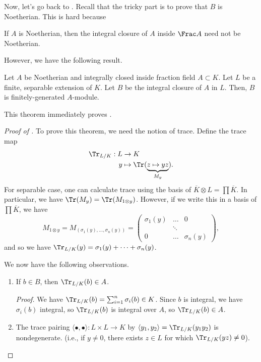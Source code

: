 Now, let's go back to .
Recall that the tricky part is to prove that $B$ is Noetherian.
This is hard because
\begin{remark}
    If $A$ is Noetherian, then the integral closure
    of $A$ inside $\Frac A$ need not be Noetherian.
\end{remark}
However, we have the following result.
\begin{theorem}
    \label{thm:aklb_finite_module}
    Let $A$ be Noetherian and integrally closed
    inside fraction field $A\subset K$.
    Let $L$ be a finite, separable extension of $K$.
    Let $B$ be the integral closure of $A$ in $L$.
    Then, $B$ is finitely-generated $A$-module.
\end{theorem}
This theorem immediately proves .
\begin{proof}[Proof of ]
    To prove this theorem, we need the notion of trace.
    Define the trace map
    \begin{align*}
	\Tr_{L/K} : L &\to K \\
	y &\mapsto \Tr(\underbrace{z\mapsto yz}_{M_y}).
    \end{align*}
    For separable case, one can calculate trace
    using the basis of $\overline K\otimes L = \prod\overline K$.
    In particular, we have $\Tr(M_y) = \Tr(M_{1\otimes y})$.
    However, if we write this in a basis of $\prod \overline K$,
    we have
    $$M_{1\otimes y} = M_{(\sigma_1(y),\dots,\sigma_n(y))}
    = \begin{pmatrix}
	\sigma_1(y) & \dots & 0 \\
	& \ddots & \\
	0 & \dots & \sigma_n(y)
    \end{pmatrix},$$
    and so we have $\Tr_{L/K}(y) = \sigma_1(y) + \dots + \sigma_n(y)$.

    We now have the following observations.
    \begin{enumerate}
    \item If $b\in B$, then $\Tr_{L/K}(b)\in A$.

    \emph{Proof.} We have $\Tr_{L/K}(b) = \sum_{i=1}^n \sigma_i(b)\in K$.
    Since $b$ is integral, we have $\sigma_i(b)$ integral,
    so $\Tr_{L/K}(b)$ is integral over $A$,
    so $\Tr_{L/K}(b)\in A$.
    \item The trace pairing $\langle \bullet,\bullet\rangle
	: L\times L\to K$ by $\langle y_1,y_2\rangle
	= \Tr_{L/K}(y_1y_2)$ is nondegenerate.
	(i.e., if $y\neq 0$, there exists $z\in L$
	for which $\Tr_{L/K}(yz)\neq 0$).


\end{enumerate}
\end{proof}
